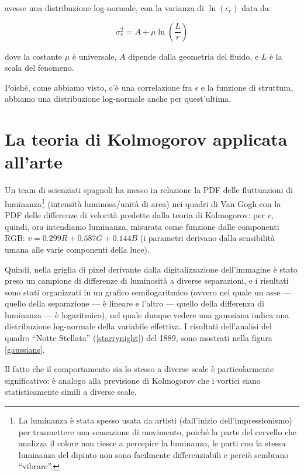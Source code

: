 \documentclass[12pt,a4paper]{article}
\numberwithin{equation}{section}
\begin{document}
avesse una distribuzione log-normale, con la varianza di $\ln (\epsilon_r)$ data da:

\begin{equation}
\sigma ^2 _r = A + \mu \ln \left(
\frac{L}{r}
\right)
\end{equation}

dove la costante $\mu$ è universale, $A$ dipende dalla geometria del fluido, e $L$ è la scala del fenomeno. 

Poiché, come abbiamo visto, c'è una correlazione fra $\epsilon$ e la funzione di struttura, abbiamo una distribuzione log-normale anche per quest'ultima.

\section{La teoria di Kolmogorov applicata all'arte}

Un team di scienziati spagnoli \cite{study2006} ha messo in relazione la PDF delle fluttuazioni di luminanza\footnote{La luminanza è stata spesso usata da artisti (dall'inizio dell'impressionismo) per trasmettere una sensazione di movimento, poiché la parte del cervello che analizza il colore non riesce a percepire la luminanza, le parti con la stessa luminanza del dipinto non sono facilmente differenziabili e perciò sembrano ``vibrare''.} (intensità luminosa/unità di area) nei quadri di Van Gogh con la PDF delle differenze di velocità predette dalla teoria di Kolmogorov: per $v$, quindi, ora intendiamo luminanza, misurata come funzione dalle componenti RGB: $v = 0.299 R + 0.587 G + 0.144B$ (i parametri derivano dalla sensibilità umana alle varie componenti della luce).

Quindi, nella griglia di pixel derivante dalla digitalizzazione dell'immagine è stato preso un campione di differenze di luminosità a diverse separazioni, e i risultati sono stati organizzati in un grafico semilogaritmico (ovvero nel quale un asse --- quello della separazione --- è lineare e l'altro --- quello della differenza di luminanza --- è logaritmico), nel quale dunque vedere una gaussiana indica una distribuzione log-normale della variabile effettiva.
I risultati dell'analisi del quadro ``Notte Stellata'' (\ref{starrynight}) del 1889, sono mostrati nella figura \ref{gaussians}.

Il fatto che il comportamento sia lo stesso a diverse scale è particolarmente significativo: è analogo alla previsione di Kolmogorov che i vortici siano statisticamente simili a diverse scale.
\end{document}
